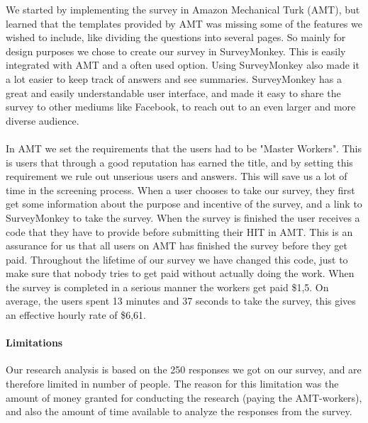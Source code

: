 We started by implementing the survey in Amazon Mechanical Turk (AMT), but learned that the templates provided by AMT was missing some of the features we wished to include, like dividing the questions into several pages. So mainly for design purposes we chose to create our survey in SurveyMonkey. This is easily integrated with AMT and a often used option.  Using SurveyMonkey also made it a lot easier to keep track of answers and see summaries. SurveyMonkey has a great and easily understandable user interface, and made it easy to share the survey to other mediums like Facebook, to reach out to an even larger and more diverse audience. 

\paragraph{}
In AMT we set the requirements that the users had to be "Master Workers". This is users that through a good reputation has earned the title, and by setting this requirement we rule out unserious users and answers. This will save us a lot of time in the screening process. When a user chooses to take our survey, they first get some information about the purpose and incentive of the survey, and a link to SurveyMonkey to take the survey. When the survey is finished the user receives a code that they have to provide before submitting their HIT in AMT. This is an assurance for us that all users on AMT has finished the survey before they get paid. Throughout the lifetime of our survey we have changed this code, just to make sure that nobody tries to get paid without actually doing the work. When the survey is completed in a serious manner the workers get paid \$1,5. On average, the users spent 13 minutes and 37 seconds to take the survey, this gives an effective hourly rate of \$6,61.    

\paragraph{Limitations} 
Our research analysis is based on the 250 responses we got on our survey, and are therefore limited in number of people. The reason for this limitation was the amount of money granted for conducting the research (paying the AMT-workers), and also the amount of time available to analyze the responses from the survey. 

